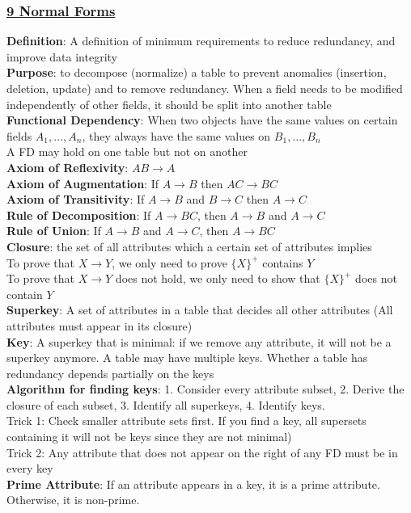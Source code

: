 \documentclass{article}
\begin{document}
{\begin{multicols*}{3}
\subsubsection*{\underline{9 Normal Forms}}
\textbf{Definition}: A definition of minimum requirements to reduce redundancy, and improve data integrity \\
\textbf{Purpose}: to decompose (normalize) a table to prevent anomalies (insertion, deletion, update) and to remove redundancy. When a field needs to be modified independently of other fields, it should be split into another table \\
\textbf{Functional Dependency}: When two objects have the same values on certain fields $A_1,\dots,A_n$, they always have the same values on $B_1,\dots,B_n$\\
A FD may hold on one table but not on another\\
\textbf{Axiom of Reflexivity}: $AB\to A$\\
\textbf{Axiom of Augmentation}: If $A\to B$ then $AC\to BC$\\
\textbf{Axiom of Transitivity}: If $A\to B$ and $B\to C$ then $A\to C$\\
\textbf{Rule of Decomposition}: If $A\to BC$, then $A\to B$ and $A\to C$\\
\textbf{Rule of Union}: If $A\to B$ and $A\to C$, then $A\to BC$\\
\textbf{Closure}: the set of all attributes which a certain set of attributes implies \\
To prove that $X\to Y$, we only need to prove $\{X\}^+$ contains $Y$ \\ 
To prove that $X\to Y$ does not hold, we only need to show that $\{X\}^+$ does not contain $Y$\\
\textbf{Superkey}: A set of attributes in a table that decides all other attributes (All attributes must appear in its closure)\\
\textbf{Key}: A superkey that is minimal: if we remove any attribute, it will not be a superkey anymore. A table may have multiple keys. Whether a table has redundancy depends partially on the keys \\
\textbf{Algorithm for finding keys}: 1. Consider every attribute subset, 2. Derive the closure of each subset, 3. Identify all superkeys, 4. Identify keys. \\
Trick 1: Check smaller attribute sets first. If you find a key, all supersets containing it will not be keys since they are not minimal)\\
Trick 2: Any attribute that does not appear on the right of any FD must be in every key\\
\textbf{Prime Attribute}: If an attribute appears in a key, it is a prime attribute. Otherwise, it is non-prime.

\end{multicols*}}
\end{document}
